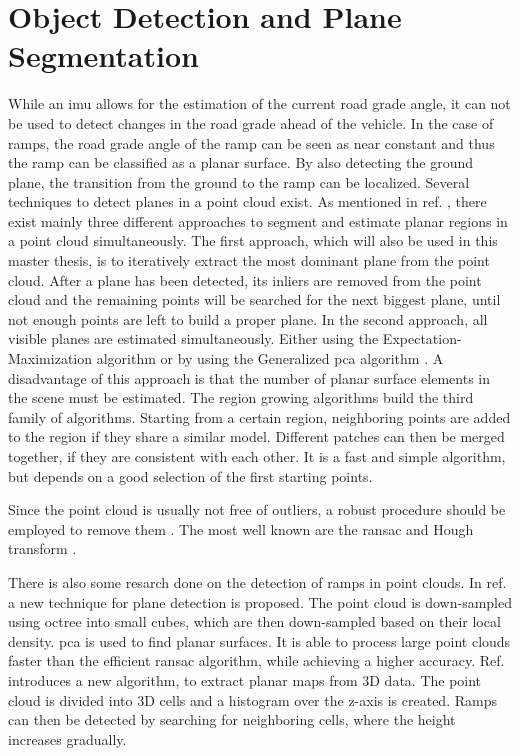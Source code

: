 \section{Object Detection and Plane Segmentation}
While an \gls{imu} allows for the estimation of the current road grade angle, it can not be used to detect changes in the road grade ahead of the vehicle.
In the case of ramps, the road grade angle of the ramp can be seen as near constant and thus the ramp can be classified as a planar surface.
By also detecting the ground plane, the transition from the ground to the ramp can be localized.
Several techniques to detect planes in a point cloud exist.
As mentioned in ref. \cite{Gallo2008}, there exist mainly three different approaches to segment and estimate planar regions in a point cloud simultaneously.
The first approach, which will also be used in this master thesis, is to iteratively extract the most dominant plane from the point cloud.
After a plane has been detected, its inliers are removed from the point cloud and the remaining points will be searched for the next biggest plane, until not enough points are left to build a proper plane.
In the second approach, all visible planes are estimated simultaneously.
Either using the Expectation-Maximization algorithm \cite{Liu2001, Triebel2005} or by using the Generalized \gls{pca} algorithm \cite{Vidal2005}.
A disadvantage of this approach is that the number of planar surface elements in the scene must be estimated.
The region growing algorithms \cite{Besl1988, Taubin1991} build the third family of algorithms.
Starting from a certain region, neighboring points are added to the region if they share a similar model.
Different patches can then be merged together, if they are consistent with each other.
It is a fast and simple algorithm, but depends on a good selection of the first starting points.\par
Since the point cloud is usually not free of outliers, a robust procedure should be employed to remove them \cite{Stewart1999,Meer2004}.
The most well known are the \gls{ransac} \cite{Fischler1981} and Hough transform \cite{Illingworth1988}.\par
There is also some resarch done on the detection of ramps in point clouds.
In ref. \cite{El-Sayed2018} a new technique for plane detection is proposed.
The point cloud is down-sampled using octree into small cubes, which are then down-sampled based on their local density.
\gls{pca} is used to find planar surfaces.
It is able to process large point clouds faster than the efficient \gls{ransac} algorithm, while achieving a higher accuracy.
Ref. \cite{Sakenas2007} introduces a new algorithm, to extract planar maps from 3D data.
The point cloud is divided into 3D cells and a histogram over the z-axis is created.
Ramps can then be detected by searching for neighboring cells, where the height increases gradually.\par

